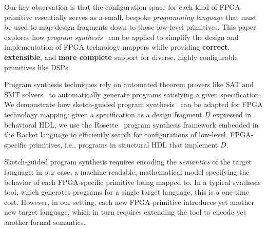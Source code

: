 Our key observation is that
  the configuration space for
  each kind of FPGA primitive
  essentially serves as a small, bespoke
  \textit{programming language}
  that must be used
  to map design fragments
  down to those low-level primitives.
This paper explores how
  \textit{program synthesis}~\cite{gulwani2017program}
  can be applied to
  simplify the design and implementation of
  FPGA technology mappers while providing
  \textbf{correct},
  \textbf{extensible}, and
  \textbf{more complete}
  support for diverse, highly configurable primitives
  like DSPs.

Program synthesis techniques rely on
  automated theorem provers like
  SAT and SMT solvers~\cite{de2008z3, barbosa22cvc5}
  to automatically generate programs
  satisfying a given specification.
We demonstrate how
  sketch-guided program synthesis~\cite{solar2008program}
  can be adapted
  for FPGA technology mapping:
  given a specification as a
  design fragment $D$ expressed in behavioral HDL,
  we use the Rosette~\cite{torlak2014lightweight} program synthesis framework embedded in the Racket language
  to efficiently search for
  configurations of
  low-level, FPGA-specific primitives,
  i.e., programs in structural HDL
  that implement $D$.\tighten


Sketch-guided program synthesis requires
  encoding the \textit{semantics}
  of the target language:
  in our case,
  a machine-readable,
  mathematical model specifying
  the behavior of each
  FPGA-specific primitive
  being mapped to.
In a typical synthesis tool,
  which generates programs
  for a single target language,
  this is a one-time cost.
However,
  in our setting,
  each new FPGA primitive
  introduces yet another new target language,
  which in turn requires
  extending the tool to encode
  yet another formal semantics.

